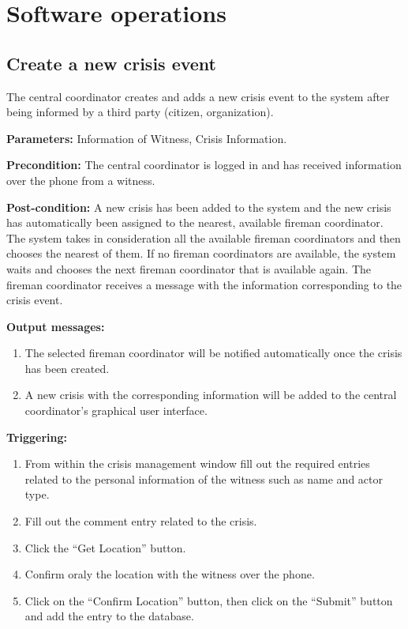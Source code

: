 \chapter{Software operations}
\label{chap:soptware_operations}


\section{Create a new crisis event}
\label{operation:MyOperation}
The central coordinator creates and adds a new crisis event to the system after
being informed by a third party (citizen, organization).

\begin{description}

\item \textbf{Parameters:} Information of Witness, Crisis Information.
\item \textbf{Precondition:} The central coordinator is logged in and has
received information over the phone from a witness.
\item \textbf{Post-condition:} A new crisis has been added to the system and the
new crisis has automatically been assigned to the nearest, available fireman
coordinator. The system takes in consideration all the available fireman
coordinators and then chooses the nearest of them. If no fireman coordinators
are available, the system waits and chooses the next fireman coordinator that is
available again. The fireman coordinator receives a message with the information
corresponding to the crisis event.
\item \textbf{Output messages:}\begin{enumerate}\item The selected fireman
coordinator will be notified automatically once the crisis has been created.
\item A new crisis with the corresponding information will be added to the
central coordinator's graphical user interface.
\end{enumerate}

\item \textbf{Triggering:}
\begin{enumerate}
\item From within the crisis management window fill out the required entries
related to the personal information of the witness such as name and actor type.
\item Fill out the comment entry related to the crisis.
\item Click the “Get Location” button.
\item Confirm oraly the location with the witness over the phone.
\item Click on the “Confirm Location” button, then click on the “Submit”
button and add the entry to the database.
\end{enumerate}

 
\end{description}

